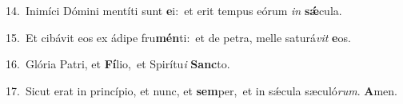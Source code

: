 {\numbfont\textcolor{\numbcolor}{14.}}~Inimíci Dómini mentíti sunt \textbf{e}\-i:~\star et erit tempus eórum \textit{in} \textbf{sǽ}\-cula.\par
{\numbfont\textcolor{\numbcolor}{15.}}~Et cibávit eos ex ádipe fru\-\textbf{mén}\-ti:~\star et de petra, melle saturá\textit{vit} \textbf{e}\-os.\par
{\numbfont\textcolor{\numbcolor}{16.}}~Glória Patri, et \textbf{Fí}\-lio,~\star et Spirítu\textit{i} \textbf{Sanc}\-to.\par
{\numbfont\textcolor{\numbcolor}{17.}}~Sicut erat in princípio, et nunc, et \textbf{sem}\-per,~\star et in sǽcula sæculó\-\textit{rum}\-. \textbf{A}\-men.\par
